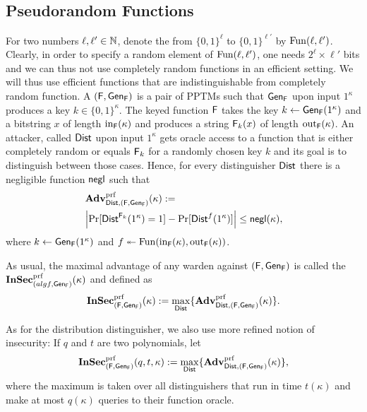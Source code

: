 \subsection*{Pseudorandom Functions}
For two numbers $\ell,\ell'\in \nats$, denote the  from
$\{0,1\}^{\ell}$ to $\{0,1\}^{\ell'}$ by $\Fun(\ell,\ell')$. Clearly, in order to
specify a random element of $\Fun(\ell,\ell')$, one needs $2^{\ell}\times \ell'$
bits and we can thus not use completely random functions in an efficient
setting. We will thus use efficient functions that are indistinguishable
from completely random function. A  $(\algf,\Gen_{\algf})$ is a
pair of \acp{PPTM} such that $\Gen_{\algf}$ upon input $1^{\kappa}$ produces
a key $k\in \{0,1\}^{\kappa}$. The keyed function $\algf$
takes the key $k\gets \Gen_{\algf}(1^{\kappa})$ and a bitstring $x$ of
length $\fin_{\algf}(\kappa)$ and produces a string $\algf_{k}(x)$ of length
$\fout_{\algf}(\kappa)$. An attacker, called  $\Dist$ upon
input $1^{\kappa}$ gets
oracle access to a function that is either completely random or equals
$\algf_{k}$ for a randomly chosen key $k$ and its goal is to distinguish
between those cases. Hence, for every distinguisher $\Dist$ there is a
negligible function $\negl$ such that
\begin{align*}
  &\Adv_{\Dist,(\algf,\Gen_{\algf})}^{\prf}(\kappa) :=\\ &\left| \Pr[\Dist^{\algf_{k}}(1^{\kappa})=1] -
  \Pr[\Dist^{f}(1^{\kappa})]\right| \leq \negl(\kappa),
\end{align*}
where $k\gets \Gen_{\algf}(1^{\kappa})$ and $f\sgets
\Fun(\fin_{\algf}(\kappa),\fout_{\algf}(\kappa))$. 

As usual, the maximal advantage of any warden against
$(\algf,\Gen_{\algf})$ is called the 
$\InSec_{(algf,\Gen_{\algf})}^{\prf}(\kappa)$ and defined as
\begin{align*}
  \InSec_{(\algf,\Gen_{\algf})}^{\prf}(\kappa) := \max_{\Dist}\{\Adv^{\prf}_{\Dist,(\algf,\Gen_{\algf})}(\kappa)\}.
\end{align*}

As for the distribution distinguisher, we also use more refined notion
of insecurity: If $q$ and $t$ are two polynomials, let
\begin{align*}
  \InSec_{(\algf,\Gen_{\algf})}^{\prf}(q,t,\kappa) := \max_{\Dist}\{\Adv^{\prf}_{\Dist,(\algf,\Gen_{\algf})}(\kappa)\},
\end{align*}
where the maximum is taken over all distinguishers that run in time
$t(\kappa)$ and make at most $q(\kappa)$ queries to their function
oracle. 

